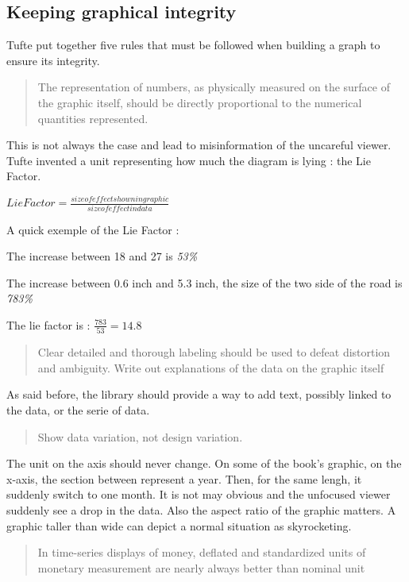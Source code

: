 \subsection{Keeping graphical integrity} 
Tufte put together five rules that must be followed when building a graph to ensure its integrity.

\begin{quote}
The representation of numbers, as physically measured on the surface of the graphic itself, should be directly proportional to the numerical quantities represented.
\end{quote}
This is not always the case and lead to misinformation of the uncareful viewer. Tufte invented a unit representing how much the diagram is lying : the Lie Factor.

$Lie Factor = \frac{size of effect shown in graphic}{size of effect in data}$

A quick exemple of the Lie Factor :


\begin{enum}
\item The increase between 18 and 27 is \emph{53\%}
\item The increase between 0.6 inch and 5.3 inch, the size of the two side of the road is \emph{783\%}
\end{enum}

The lie factor is  : $\frac{783}{53} = 14.8$ 

\begin{quote}
Clear detailed and thorough labeling should be used to defeat distortion and ambiguity. Write out explanations of the data on the graphic itself
\end{quote}

As said before, the library should provide a way to add text, possibly linked to the data, or the serie of data.
\begin{quote}
Show data variation, not design variation.
\end{quote}
The unit on the axis should never change. On some of the book's graphic, on the x-axis, the section between represent a year.
Then, for the same lengh, it suddenly switch to one month. It is not may obvious and the unfocused viewer suddenly see a drop in the data. 
Also the aspect ratio of the graphic matters. A graphic taller than wide can depict a normal situation as skyrocketing.

\begin{quote}
In time-series displays of money, deflated and standardized units of monetary measurement are nearly always better than nominal unit
\end{quote}

